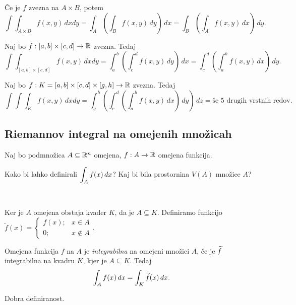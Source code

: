 \begin{posledica}
    Če je \(f\) zvezna na \(A \times B\), potem \[\int \int_{A \times B} f(x,y) \, dxdy = \int_A \left(\int_B f(x,y) \, dy\right) \, dx = \int_B \left(\int_A f(x,y) \, dx\right) \, dy.\]
\end{posledica}

\begin{posledica}
    Naj bo \(f:[a,b] \times [c,d] \to \mathbb{R}\) zvezna. Tedaj
    \[\int \int_{[a,b] \times [c,d]} f(x,y) \, dxdy = \int_a^b \left(\int_c^d f(x,y) \, dy\right) \, dx = \int_c^d \left(\int_a^b f(x,y) \, dx\right) \, dy.\]
\end{posledica}

\begin{posledica}
    Naj bo \(f: K = [a,b] \times [c,d] \times [g, h] \to \mathbb{R}\) zvezna. Tedaj
    \[\int \int \int_K f(x,y) \, dxdy = \int_g^h \left( \int_c^d \left(\int_a^b f(x,y) \, dx\right) \, dy\right) \, dz = \text{še \(5\) drugih vrstnih redov}.\]
\end{posledica}

\begin{zgled}
    \todo{}
\end{zgled}

\subsection{Riemannov integral na omejenih množicah}
Naj bo podmnožica \(A \subseteq \mathbb{R}^n\) omejena, \(f: A \to \mathbb{R}\) omejena funkcija. 

Kako bi lahko definirali \(\displaystyle \int_A f(x) \, dx\)? Kaj bi bila prostornina \(V(A)\) množice \(A\)?

\

Ker je \(A\) omejena obstaja kvader \(K\), da je \(A \subseteq K\). Definiramo funkcijo \(\widetilde{f}(x) =  \begin{cases}
    f(x); & x \in A \\ 0; & x \notin A
\end{cases}.\)

\begin{definicija}
    Omejena funkcija \(f\) na \(A\) je \emph{integrabilna} na omejeni množici \(A\), če je \(\widetilde{f}\) integrabilna na kvadru \(K\), kjer je \(A \subseteq K\). Tedaj \[\int_A f(x) \, dx = \int_K \widetilde{f}(x) \, dx.\]
\end{definicija}

\begin{opomba}
    Dobra definiranost. \todo{}
\end{opomba}

